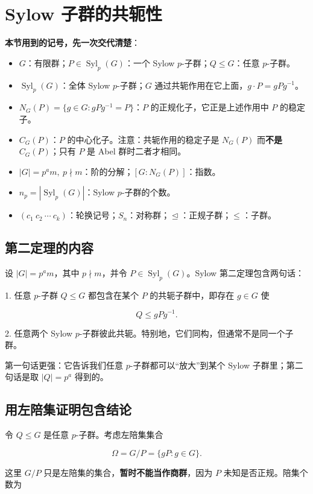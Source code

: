 \section{Sylow 子群的共轭性}


\textbf{本节用到的记号，先一次交代清楚}：

\begin{itemize}
\item $G$：有限群；$P\in\operatorname{Syl}_p(G)$：一个 Sylow $p$-子群；$Q\le G$：任意 $p$-子群。
\item $\operatorname{Syl}_p(G)$：全体 Sylow $p$-子群；$G$ 通过共轭作用在它上面，$g\cdot P=gPg^{-1}$。
\item $N_G(P)=\{g\in G:gPg^{-1}=P\}$：$P$ 的正规化子，它正是上述作用中 $P$ 的稳定子。
\item $C_G(P)$：$P$ 的中心化子。注意：共轭作用的稳定子是 $N_G(P)$ 而\textbf{不是} $C_G(P)$；只有 $P$ 是 Abel 群时二者才相同。
\item $|G|=p^am,\ p\nmid m$：阶的分解；$[G:N_G(P)]$：指数。
\item $n_p=|\operatorname{Syl}_p(G)|$：Sylow $p$-子群的个数。
\item $(c_1\ c_2\ \cdots\ c_k)$：轮换记号；$S_n$：对称群；$\trianglelefteq$：正规子群；$\le$：子群。
\end{itemize}


\subsection{第二定理的内容}


设 $|G|=p^a m$，其中 $p\nmid m$，并令 $P\in\operatorname{Syl}_p(G)$。Sylow 第二定理包含两句话：

1. 任意 $p$-子群 $Q\le G$ 都包含在某个 $P$ 的共轭子群中，即存在 $g\in G$ 使

\[
   Q\le gPg^{-1}.
\]

2. 任意两个 Sylow $p$-子群彼此共轭。特别地，它们同构，但通常不是同一个子群。

第一句话更强：它告诉我们任意 $p$-子群都可以“放大”到某个 Sylow 子群里；第二句话是取 $|Q|=p^a$ 得到的。

\subsection{用左陪集证明包含结论}


令 $Q\le G$ 是任意 $p$-子群。考虑左陪集集合

\[
\Omega=G/P=\{gP:g\in G\}.
\]

这里 $G/P$ 只是左陪集的集合，\textbf{暂时不能当作商群}，因为 $P$ 未知是否正规。陪集个数为


